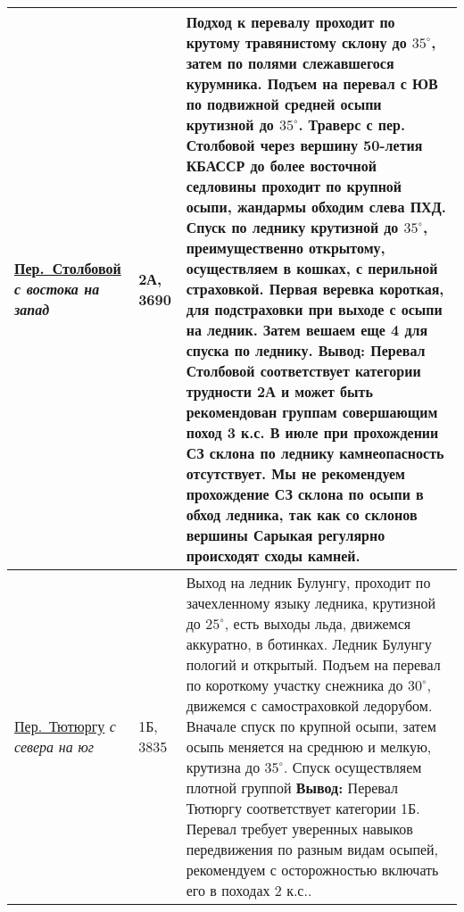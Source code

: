 {\begin{longtable}{|>{\centering\arraybackslash}m{3.8cm}|>{\centering\arraybackslash}m{1.3cm}|>{\raggedright\arraybackslash}m{12.5cm}|}
		 	\hyperref[subsec:Day11]{Пер.~Столбовой}																	\newline\textit{с востока на запад}		&	2А, 3690					&	Подход к перевалу проходит по крутому травянистому склону  до $35^\circ$, затем по полями слежавшегося курумника. Подъем на перевал с ЮВ по подвижной средней осыпи крутизной до $35^\circ$. Траверс с пер. Столбовой через вершину 50-летия КБАССР до более восточной седловины проходит по крупной осыпи, жандармы обходим слева ПХД. Спуск по леднику крутизной до $35^\circ$, преимущественно открытому, осуществляем в кошках, с перильной страховкой. Первая веревка короткая, для подстраховки при выходе с осыпи на ледник. Затем вешаем еще 4 для спуска по леднику. \newline \textbf{Вывод:} Перевал Столбовой соответствует категории трудности 2А и может быть рекомендован группам совершающим поход 3 к.с. В июле при прохождении СЗ склона по леднику камнеопасность отсутствует. Мы не рекомендуем прохождение СЗ склона по осыпи в обход ледника, так как со склонов вершины Сарыкая регулярно происходят сходы камней.																																																																																																																																																																																																																																																																															\\ \hline
			\hyperref[subsec:Day12]{Пер.~Тютюргу}																	\newline\textit{с севера на юг}			&	1Б, 3835					&	Выход на ледник Булунгу, проходит по зачехленному языку ледника, крутизной до $25^\circ$, есть выходы льда, движемся аккуратно, в ботинках. Ледник Булунгу пологий и открытый. Подъем на перевал по короткому участку снежника до $30^\circ$, движемся с самостраховкой ледорубом. Вначале спуск по крупной осыпи, затем осыпь меняется на среднюю и мелкую, крутизна до $35^\circ$. Спуск осуществляем плотной группой \newline \textbf{Вывод:} Перевал Тютюргу соответствует категории 1Б. Перевал требует уверенных навыков передвижения по разным видам осыпей, рекомендуем с осторожностью включать его в походах 2 к.с..																																																																																																																																																																																																																																																																																																																																																															\\ \hline

\end{longtable}}
